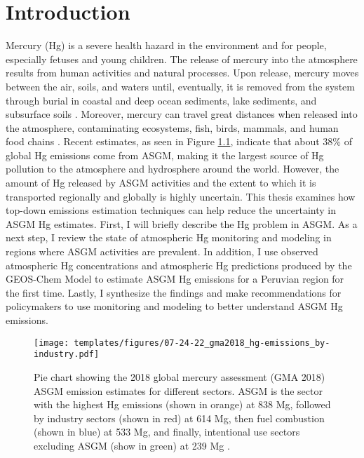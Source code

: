 
\chapter{Introduction}
Mercury (Hg) is a severe health hazard in the environment and for people, especially fetuses and young children\cite{gibb_mercury_2014}. The release of mercury into the atmosphere results from human activities and natural processes. Upon release, mercury moves between the air, soils, and waters until, eventually, it is removed from the system through burial in coastal and deep ocean sediments, lake sediments, and subsurface soils \cite{esdaile_mercury_2018}. Moreover, mercury can travel great distances when released into the atmosphere, contaminating ecosystems, fish, birds, mammals, and human food chains \cite{esdaile_mercury_2018}. Recent estimates, as seen in Figure \ref{fig:gma2018_hg-emissions_by-industry},  indicate that about 38\% of global Hg emissions come from ASGM, making it the largest source of Hg pollution to the atmosphere and hydrosphere around the world\cite{united_nations_environment_programme_technical_2019}. However, the amount of Hg released by ASGM activities and the extent to which it is transported regionally and globally is highly uncertain. This thesis examines how top-down emissions estimation techniques can help reduce the uncertainty in ASGM Hg estimates. First, I will briefly describe the Hg problem in ASGM. As a next step, I review the state of atmospheric Hg monitoring and modeling in regions where ASGM activities are prevalent. In addition, I use observed atmospheric Hg concentrations and atmospheric Hg predictions produced by the GEOS-Chem Model to estimate ASGM Hg emissions for a Peruvian region for the first time. Lastly, I synthesize the findings and make recommendations for policymakers to use monitoring and modeling to better understand ASGM Hg emissions.

\begin{figure}[H]
  \texttt{[image: templates/figures/07-24-22\_gma2018\_hg-emissions\_by-industry.pdf]}
  \centering
  \caption[Pie chart showing the 2018 global mercury assessment (GMA 2018) ASGM \hg emission estimates for different sectors.]{ Pie chart showing the 2018 global mercury assessment (GMA 2018) ASGM \hg emission estimates for different sectors. ASGM is the sector with the highest Hg emissions (shown in orange) at 838 Mg, followed by industry sectors (shown in red) at 614 Mg, then fuel combustion (shown in blue) at 533 Mg, and finally, intentional use sectors excluding ASGM (show in green) at 239 Mg \cite{united_nations_environment_programme_technical_2019}.}
  \label{fig:gma2018_hg-emissions_by-industry}
\end{figure}
\FloatBarrier

